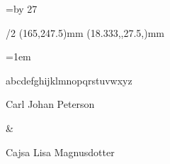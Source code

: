 \fontfam[adobejenson]



\typosize[12/15.3]


\svlang

\hsize=110mm
\vsize=\topskip \advance\vsize by 27\baselineskip\relax

\margins/2 (165,247.5)mm (18.333,,27.5,)mm

\parskip=0pt
\parindent=1em

\baselineskip

\def\hairspace		{\hskip\dimexpr(1em/24)\relax}
\def\thinspace		{\hskip\dimexpr(1em/8)\relax}
\def\sixthspace		{\hskip\dimexpr(1em/6)\relax}
\def\quarterspace	{\hskip\dimexpr(1em/4)\relax}
\def\enspace		{\hskip\dimexpr(1em/2)\relax}
\def\emspace		{\hskip\dimexpr(1em)\relax}

\def\capspace		{\hskip\dimexpr(1em/14)\relax}

\hbox{abcdefghijklmnopqrstuvwxyz}
\the{}


{%
	\typosize[14.4/]
	\it
	\centerline{Carl Johan Peterson}
	\baselineskip
	\centerline{\rm \&}
	\baselineskip
	\centerline{Cajsa Lisa Magnusdotter}
}
\baselineskip

